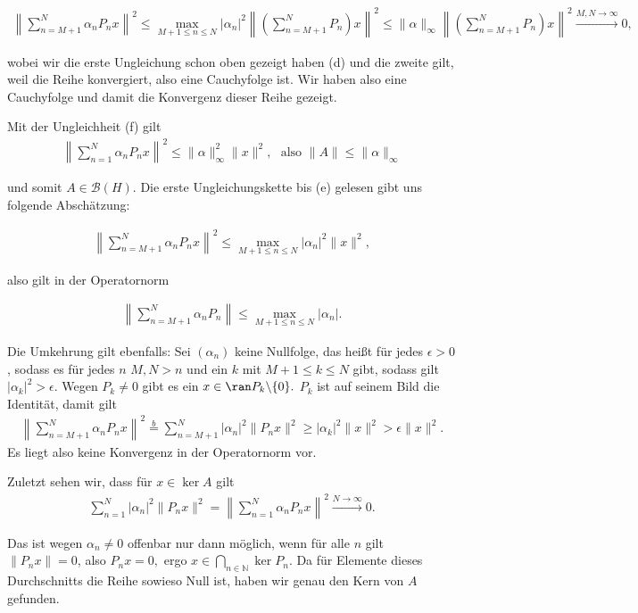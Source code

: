 \begin{solution}
\begin{align}
\left\| \sum_{n = M+1}^N \alpha_n P_n x \right\|^2 \leq \max_{M+1 \leq n \leq N} |\alpha_n|^2 \left\| \left(\sum_{n = M+1}^N P_n\right) x \right\|^2
\leq \|\alpha\|_{\infty} \left\| \left(\sum_{n = M+1}^N P_n\right) x \right\|^2 \stackrel{M, N \rightarrow \infty}{\longrightarrow} 0,
\end{align}

wobei wir die erste Ungleichung schon oben gezeigt haben (d) und die zweite gilt, weil die Reihe konvergiert, also eine Cauchyfolge ist. Wir haben also eine Cauchyfolge und damit die Konvergenz dieser Reihe gezeigt.

Mit der Ungleichheit (f) gilt
\begin{align}
    \left\| \sum_{n = 1}^N \alpha_n P_n x \right\|^2 \leq \| \alpha \|_{\infty}^2 \| x \|^2, \text{~~also~} \|A\| \leq \|\alpha\|_{\infty}
\end{align}

und somit $A \in \mathcal{B}(H).$ Die erste Ungleichungskette bis (e) gelesen gibt uns folgende Abschätzung:

\begin{align}
\left\| \sum_{n = M+1}^N \alpha_n P_n x \right\|^2 \leq \max_{M+1 \leq n \leq N} |\alpha_n|^2 \|x\|^2,
\end{align}

also gilt in der Operatornorm

\begin{align}
\left\| \sum_{n = M+1}^N \alpha_n P_n \right\| \leq \max_{M+1 \leq n \leq N} |\alpha_n|.
\end{align}

Die Umkehrung gilt ebenfalls: Sei $(\alpha_n)$ keine Nullfolge, das heißt für jedes $\epsilon > 0$, sodass es für jedes $n$ $M, N > n$ und ein $k$ mit $M+1 \leq k \leq N$ gibt, sodass gilt $|\alpha_k|^2 > \epsilon.$ Wegen $P_k \neq 0$ gibt es ein $x \in \ran P_k\backslash\{0\}.$ $P_k$ ist auf seinem Bild die Identität, damit gilt
\begin{align}
 \left\| \sum_{n = M+1}^N \alpha_n P_n x \right\|^2 \stackrel{b}{=} \sum_{n = M+1}^N | \alpha_n|^2 \| P_n x \|^2 \geq |\alpha_k|^2 \|x\|^2 > \epsilon \|x\|^2.
\end{align}
Es liegt also keine Konvergenz in der Operatornorm vor.


Zuletzt sehen wir, dass für $x \in \ker A$ gilt
\begin{align*}
    \sum_{n=1}^N |\alpha_n|^2 \|P_n x\|^2 =
    \left\| \sum_{n = 1}^N \alpha_n P_n x \right\|^2 \stackrel{N \rightarrow \infty}{\longrightarrow} 0.
\end{align*}

Das ist wegen $\alpha_n \neq 0$ offenbar nur dann möglich, wenn für alle $n$ gilt $\|P_n x\| = 0$, also $P_n x = 0,$ ergo $x \in \bigcap_{n \in \mathbb{N}} \ker P_n$. Da für Elemente dieses Durchschnitts die Reihe sowieso Null ist, haben wir genau den Kern von $A$ gefunden.
\end{solution}
